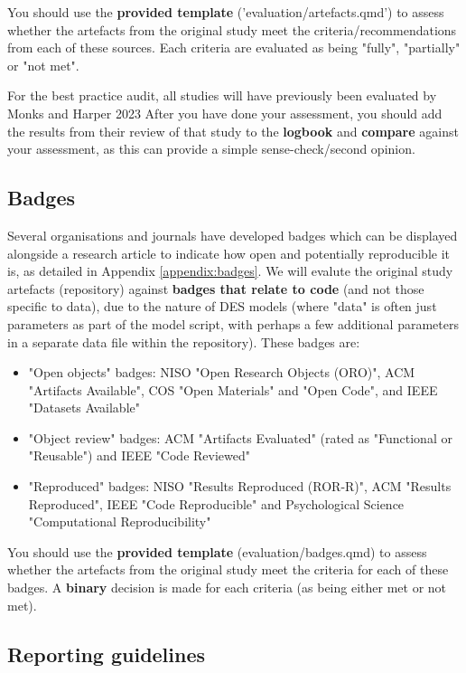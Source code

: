 You should use the \textbf{provided template} ('evaluation/artefacts.qmd') to assess whether the artefacts from the original study meet the criteria/recommendations from each of these sources. Each criteria are evaluated as being "fully", "partially" or "not met".

For the best practice audit, all studies will have previously been evaluated by Monks and Harper 2023\autocite{monks_computer_2023} After you have done your assessment, you should add the results from their review of that study to the \textbf{logbook} and \textbf{compare} against your assessment, as this can provide a simple sense-check/second opinion.

\newpage
\subsection{Badges} \label{sec:badges}

Several organisations and journals have developed badges which can be displayed alongside a research article to indicate how open and potentially reproducible it is, as detailed in Appendix \ref{appendix:badges}. We will evalute the original study artefacts (repository) against \textbf{badges that relate to code} (and not those specific to data), due to the nature of DES models (where "data" is often just parameters as part of the model script, with perhaps a few additional parameters in a separate data file within the repository). These badges are:
\begin{itemize}
    \item "Open objects" badges: NISO "Open Research Objects (ORO)", ACM "Artifacts Available", COS "Open Materials" and "Open Code", and IEEE "Datasets Available"
    \item "Object review" badges: ACM "Artifacts Evaluated" (rated as "Functional or "Reusable") and IEEE "Code Reviewed"
    \item "Reproduced" badges: NISO "Results Reproduced (ROR-R)", ACM "Results Reproduced", IEEE "Code Reproducible" and Psychological Science "Computational Reproducibility"
\end{itemize}

You should use the \textbf{provided template} (evaluation/badges.qmd) to assess whether the artefacts from the original study meet the criteria for each of these badges. A \textbf{binary} decision is made for each criteria (as being either met or not met).

\vspace{0.5cm}
\subsection{Reporting guidelines} \label{sec:reporting}

